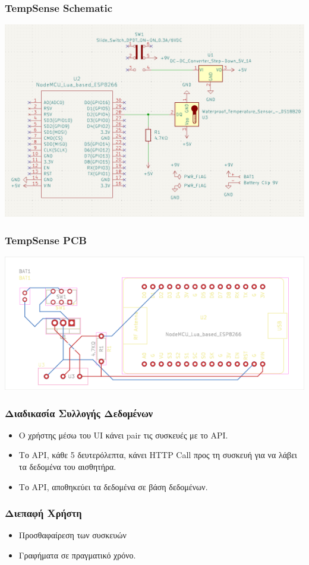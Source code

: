 \documentclass{beamer}
\begin{document}
\begin{frame}
\frametitle{TempSense Schematic}
	\centerline{\includegraphics[height=0.6\textwidth]{assets/tempsense-schematic}}
\end{frame}
\begin{frame}
\frametitle{TempSense PCB}
	\colorbox{PineGreen}{\centerline{\includegraphics[height=0.4\textwidth]{assets/TempSense-brd}}}
\end{frame}

\begin{frame}
\frametitle{Διαδικασία Συλλογής Δεδομένων}
\begin{itemize}
    \item Ο χρήστης μέσω του UI κάνει pair τις συσκευές με το API.
    \item Το API, κάθε 5 δευτερόλεπτα, κάνει HTTP Call προς τη συσκευή για να λάβει τα δεδομένα του αισθητήρα.
    \item Το API, αποθηκεύει τα δεδομένα σε βάση δεδομένων.
\end{itemize}
\end{frame}

\begin{frame}
\frametitle{Διεπαφή Χρήστη}
\begin{itemize}
    \item Προσθαφαίρεση των συσκευών
    \item Γραφήματα σε πραγματικό χρόνο.
\end{itemize}
\end{frame}
\end{document}
